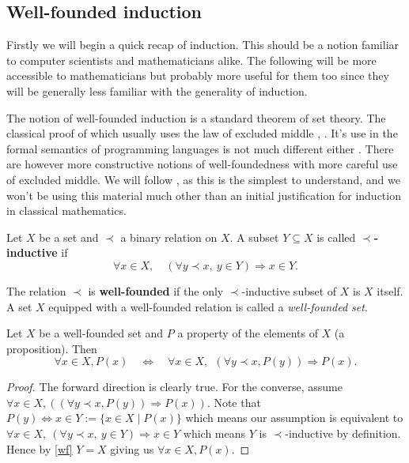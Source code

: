 \subsection{Well-founded induction}

Firstly we will begin a quick recap of induction. This should be a notion familiar to computer scientists and mathematicians alike. The following will be more accessible to mathematicians but probably more useful for them too since they will be generally less familiar with the generality of induction.


The notion of well-founded induction is a standard theorem of set theory. The classical proof of which usually uses the law of excluded middle \cite[p. 62]{johnstone1987notes}, \cite[Ch. 7]{barwise1982handbook}. It's use in the formal semantics of programming languages is not much different either \cite[Ch. 3]{winskel1993formal}. There are however more constructive notions of well-foundedness \cite[\S 8]{2018arXiv180805204S} with more careful use of excluded middle. We will follow \cite{10.2307/2275781}, as this is the simplest to understand, and we won't be using this material much other than an initial justification for induction in classical mathematics.

\begin{defin}
    Let $X$ be a set and $\prec$ a binary relation on $X$. A subset $Y \subseteq X$ is called \textbf{$\prec$-inductive} if
    $$
        \forall x \in X, \quad (\forall y \prec x,\ y \in Y) \Rightarrow x \in Y.
    $$
\end{defin}

\begin{defin}\label{wf}
    The relation $\prec$ is \textbf{well-founded} if the only $\prec$-inductive subset of $X$ is $X$ itself. A set $X$ equipped with a well-founded relation is called a \textit{well-founded set}.
\end{defin}

\begin{theorem}
    Let $X$ be a well-founded set and $P$ a property of the elements of $X$ (a proposition). Then
    $$
        \forall x \in X, P(x) \quad \iff \quad  \forall x \in X,\ \ (\forall y \prec x, P(y)) \Rightarrow P(x).
    $$
\end{theorem}
\begin{proof}
    The forward direction is clearly true. For the converse, assume $\forall x \in X,((\forall y \prec x, P(y)) \Rightarrow P(x))$. Note that $P(y) \Leftrightarrow x \in Y := \{ x \in X \mid P(x)\} $ which means our assumption is equivalent to $\forall x \in X,\ (\forall y \prec x,\ y \in Y) \Rightarrow x \in Y$ which means $Y$ is $\prec$-inductive by definition. Hence by \ref{wf} $Y=X$ giving us $ \forall x \in X, P(x)$.
\end{proof}

